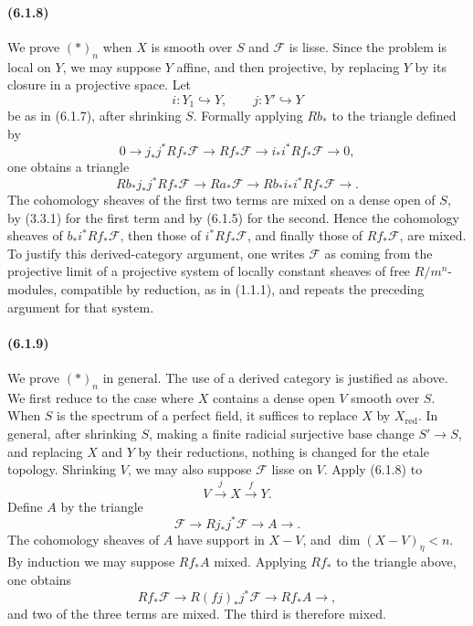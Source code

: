 \documentclass[11pt]{article}
\theoremstyle{remark}
\begin{document}
\paragraph{(6.1.8)}
We prove \((*)_n\) when \(X\) is smooth over \(S\) and \(\mathcal F\) is lisse.  Since the problem is local on \(Y\), we may suppose \(Y\) affine, and then projective, by replacing \(Y\) by its closure in a projective space.  Let
\[
 i:Y_1\hookrightarrow Y,
 \qquad j:Y'\hookrightarrow Y
\]
be as in (6.1.7), after shrinking \(S\).  Formally applying \(Rb_*\) to the triangle defined by
\[
0\longrightarrow j_*j^*Rf_*\mathcal F
\longrightarrow Rf_*\mathcal F
\longrightarrow i_*i^*Rf_*\mathcal F
\longrightarrow 0,
\]
one obtains a triangle
\[
Rb_*j_*j^*Rf_*\mathcal F\longrightarrow Ra_*\mathcal F
\longrightarrow Rb_*i_*i^*Rf_*\mathcal F\longrightarrow.
\]
The cohomology sheaves of the first two terms are mixed on a dense open of \(S\), by (3.3.1) for the first term and by (6.1.5) for the second.  Hence the cohomology sheaves of \(b_*i^*Rf_*\mathcal F\), then those of \(i^*Rf_*\mathcal F\), and finally those of \(Rf_*\mathcal F\), are mixed.  To justify this derived-category argument, one writes \(\mathcal F\) as coming from the projective limit of a projective system of locally constant sheaves of free \(R/m^n\)-modules, compatible by reduction, as in (1.1.1), and repeats the preceding argument for that system.

\paragraph{(6.1.9)}
We prove \((*)_n\) in general.  The use of a derived category is justified as above.  We first reduce to the case where \(X\) contains a dense open \(V\) smooth over \(S\).  When \(S\) is the spectrum of a perfect field, it suffices to replace \(X\) by \(X_{\mathrm{red}}\).  In general, after shrinking \(S\), making a finite radicial surjective base change \(S'\to S\), and replacing \(X\) and \(Y\) by their reductions, nothing is changed for the etale topology.  Shrinking \(V\), we may also suppose \(\mathcal F\) lisse on \(V\).  Apply (6.1.8) to
\[
V\xrightarrow{j}X\xrightarrow{f}Y.
\]
Define \(A\) by the triangle
\[
\mathcal F\longrightarrow Rj_*j^*\mathcal F\longrightarrow A\longrightarrow.
\]
The cohomology sheaves of \(A\) have support in \(X-V\), and \(\dim (X-V)_\eta<n\).  By induction we may suppose \(Rf_*A\) mixed.  Applying \(Rf_*\) to the triangle above, one obtains
\[
Rf_*\mathcal F\longrightarrow R(fj)_*j^*\mathcal F\longrightarrow Rf_*A\longrightarrow,
\]
and two of the three terms are mixed.  The third is therefore mixed.
\end{document}
